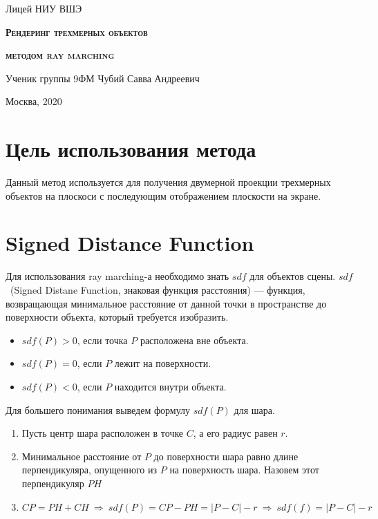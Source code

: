 \documentclass[12pt,a4paper]{article}
\begin{document}
\begin{titlepage}

\thispagestyle{empty}

\centerline{Лицей НИУ ВШЭ}

\vfill

\centerline{\large{\textsc{\textbf{Рендеринг трехмерных объектов}}}}
\centerline{\large{\textsc{\textbf{методом ray marching}}}}

\vfill

Ученик группы 9ФМ \hfill Чубий Савва Андреевич

\vfill

\centerline{Москва, 2020}
\clearpage
\end{titlepage}
\sloppy


\section{Цель использования метода}
Данный метод используется для получения двумерной проекции трехмерных объектов
на плоскоси с последующим отображением плоскости на экране.


\section{Signed Distance Function}
Для использования ray marching-а необходимо знать $sdf$ для объектов сцены.
$sdf$~(Signed Distane Function, знаковая функция расстояния) --- функция,
возвращающая минимальное расстояние от данной точки в пространстве до
поверхности объекта, который требуется изобразить.
\begin{itemize}
    \item $sdf(P) > 0$, если точка $P$ расположена вне объекта.
    \item $sdf(P) = 0$, если $P$ лежит на поверхности.
    \item $sdf(P) < 0$, если $P$ находится внутри объекта.
\end {itemize}
\vspace{\baselineskip}

Для большего понимания выведем формулу $sdf(P)$ для шара.
\begin{enumerate}
    \item Пусть центр шара расположен в точке $C$, а его радиус равен $r$.
    \item Минимальное расстояние от $P$ до поверхности шара равно длине
        перпендикуляра, опущенного из $P$ на поверхность шара. Назовем этот
        перпендикуляр $PH$
    \item $CP = PH + CH  \ \Rightarrow \  sdf(P) = CP - PH = \left|P - C\right| - r  
        \ \Rightarrow \  sdf(f) = \left|P - C\right| - r$
\end{enumerate}
\end{document}
